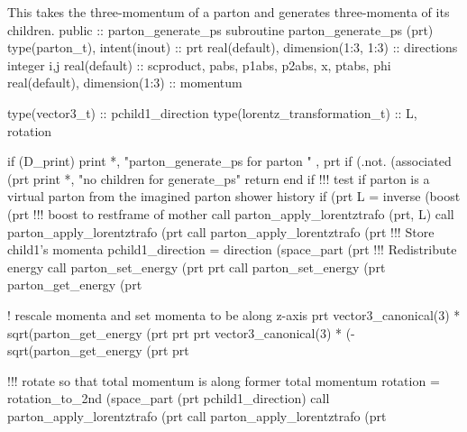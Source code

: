 \eatline
\nwendcode{}This takes the three-momentum of a parton and generates
three-momenta of its children.
\nwenddocs{}\plusendmoddef
  public :: parton_generate_ps
\nwendcode{}\plusendmoddef
  subroutine parton_generate_ps (prt)
    type(parton_t), intent(inout) :: prt
    real(default), dimension(1:3, 1:3) :: directions
    integer i,j
    real(default) :: scproduct, pabs, p1abs, p2abs, x, ptabs, phi
    real(default), dimension(1:3) :: momentum

    type(vector3_t) :: pchild1_direction
    type(lorentz_transformation_t) :: L, rotation

    if (D_print) print *, "parton_generate_ps for parton " , prt%
    if (.not. (associated (prt%
       print *, "no children for generate_ps"
       return
    end if
    !!! test if parton is a virtual parton from the imagined parton shower history
    if (prt%
       L = inverse (boost (prt%
       !!! boost to restframe of mother
       call parton_apply_lorentztrafo (prt, L)
       call parton_apply_lorentztrafo (prt%
       call parton_apply_lorentztrafo (prt%
       !!! Store child1's momenta
       pchild1_direction = direction (space_part (prt%
       !!! Redistribute energy
       call parton_set_energy (prt%
            prt%
       call parton_set_energy (prt%
            parton_get_energy (prt%

       ! rescale momenta and set momenta to be along z-axis
       prt%
            vector3_canonical(3) * sqrt(parton_get_energy (prt%
            prt%
       prt%
            vector3_canonical(3) * (-sqrt(parton_get_energy (prt%
            prt%

       !!! rotate so that total momentum is along former total momentum
       rotation = rotation_to_2nd (space_part (prt%
            pchild1_direction)
       call parton_apply_lorentztrafo (prt%
       call parton_apply_lorentztrafo (prt%

